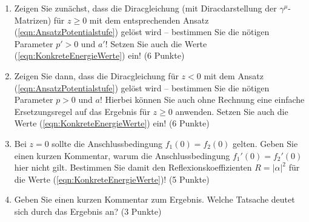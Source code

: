 \documentclass[german, parskip=full]{scrartcl}
\begin{document}
\begin{enumerate}
\item[a)] Zeigen Sie zunächst, dass die Diracgleichung (mit Diracdarstellung der $\gamma^\mu$-Matrizen) für $z\ge 0$ mit dem entsprechenden Ansatz (\ref{eqn:AnsatzPotentialstufe}) gelöst wird -- bestimmen Sie die nötigen Parameter $p'>0$ und $a'$! 
Setzen Sie auch die Werte (\ref{eqn:KonkreteEnergieWerte}) ein! (6 Punkte)
\item[b)] Zeigen Sie dann, dass die Diracgleichung für $z < 0$ mit dem Ansatz (\ref{eqn:AnsatzPotentialstufe}) gelöst wird --
bestimmen Sie die nötigen Parameter $p>0$ und $a$!
Hierbei können Sie auch ohne Rechnung eine
einfache Ersetzungsregel auf das Ergebnis für $z \ge 0$ anwenden. 
Setzen Sie auch die Werte
(\ref{eqn:KonkreteEnergieWerte}) ein! (6 Punkte)
\item[c)] Bei $z = 0$ sollte die Anschlussbedingung $f_1 (0) = f_2 (0)$ gelten. 
Geben Sie einen kurzen
Kommentar, warum die Anschlussbedingung $f_1'(0)=f_2'(0)$ hier nicht gilt. 
Bestimmen Sie
damit den Reflexionskoeffizienten $R = |\alpha|^2$ für die Werte (\ref{eqn:KonkreteEnergieWerte})! (5 Punkte)
\item[d)] Geben Sie einen kurzen Kommentar zum Ergebnis. 
Welche Tatsache deutet sich durch
das Ergebnis an? (3 Punkte)
\end{enumerate}
\newpage
\end{document}
